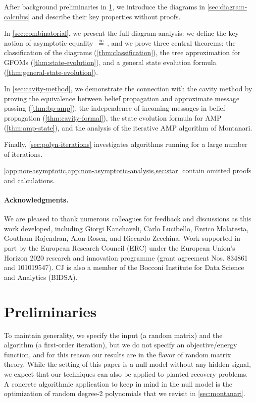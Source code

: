 \documentclass[12pt]{article}
\newcommand{\eqinf}{\,\overset{\infty}{=}\,}
\begin{document}
After background preliminaries in \cref{sec:preliminaries},
we introduce the diagrams in \cref{sec:diagram-calculus} and describe
their key properties without proofs.

In \cref{sec:combinatorial}, we present the full diagram analysis: we 
define the key notion of asymptotic
equality $\eqinf$, and we prove three central theorems: the classification of the diagrams (\cref{thm:classification}), the tree approximation for GFOMs (\cref{thm:state-evolution}), and a general state evolution
formula (\cref{thm:general-state-evolution}).

In \cref{sec:cavity-method}, we demonstrate
the connection with the cavity method by
proving the equivalence between
belief propagation and approximate
message passing (\cref{thm:bp-amp}), the
independence of incoming messages in 
belief propagation
(\cref{thm:cavity-formal}), the state
evolution formula for AMP (\cref{thm:amp-state}),
and the analysis of the iterative AMP algorithm
of Montanari.

Finally, \cref{sec:polyn-iterations} investigates algorithms running for a large number of iterations.

\cref{app:non-asymptotic,app:non-asymptotic-analysis,sec:star} contain omitted proofs and calculations.


\vspace{-8pt}
\paragraph{Acknowledgments.}
We are pleased to thank numerous colleagues for feedback and discussions as this work developed, including Giorgi Kanchaveli, Carlo Lucibello, Enrico Malatesta, Goutham Rajendran, Alon Rosen, and Riccardo Zecchina.
Work supported in part by the European Research Council (ERC) under the European
Union’s Horizon 2020 research and innovation programme (grant agreement Nos. 834861 and 101019547).
CJ is also a member of the Bocconi Institute for Data Science and Analytics (BIDSA).
 
\section{Preliminaries}
\label{sec:preliminaries}

To maintain generality, we specify the input (a random matrix) and the algorithm (a first-order iteration), but we do not specify an objective/energy function, and for this reason our results are in the flavor of random matrix theory. 
While the setting of this paper is a null model without any hidden signal, 
we expect that our techniques can also be applied to planted recovery problems.
A concrete algorithmic application to 
keep in mind in the null model
is the optimization of
random degree-2 polynomials that we revisit in
\cref{sec:montanari}.
\end{document}
